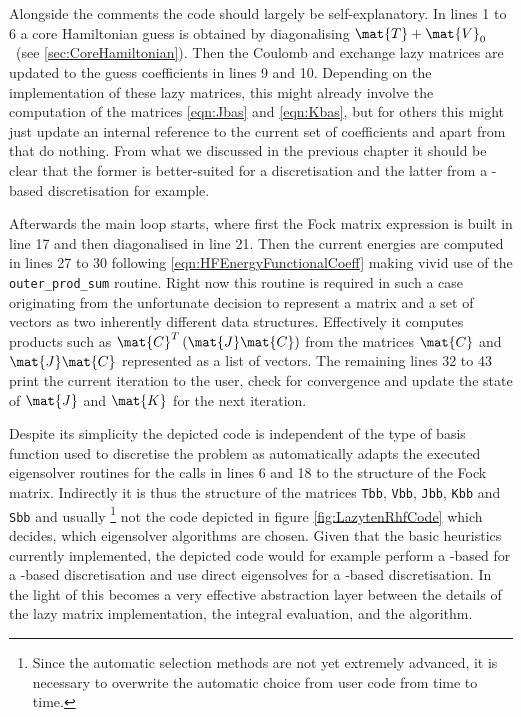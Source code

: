 Alongside the comments the code should largely be self-explanatory.
In lines 1 to 6 a core Hamiltonian guess is obtained by diagonalising
$\mat{T} + \mat{V}_0$~(see \ref{sec:CoreHamiltonian}).
Then the Coulomb and exchange lazy matrices
are updated to the guess coefficients in lines 9 and 10.
Depending on the implementation of these lazy matrices,
this might already involve the computation
of the matrices \eqref{eqn:Jbas} and \eqref{eqn:Kbas},
but for others this might just update an internal reference
to the current set of coefficients and apart from that do nothing.
From what we discussed in the previous chapter
it should be clear that the former is better-suited for a \cGTO
discretisation and the latter from a \FE-based discretisation for example.

Afterwards the main loop starts, where first the Fock matrix
expression is built in line 17 and then diagonalised in line 21.
Then the current energies are computed in lines 27 to 30
following \eqref{eqn:HFEnergyFunctionalCoeff} making
vivid use of the \texttt{outer\_prod\_sum} routine.
Right now this routine is required
in such a case originating from the unfortunate decision
to represent a matrix and a set of vectors as two inherently
different data structures.
Effectively it computes products such as
$\mat{C}^T \left(\mat{J} \mat{C}\right)$
from the matrices $\mat{C}$ and $\mat{J} \mat{C}$
represented as a list of vectors.
The remaining lines 32 to 43 print the current iteration
to the user, check for convergence and update the state
of $\mat{J}$ and $\mat{K}$ for the next iteration.

Despite its simplicity the depicted code is independent of
the type of basis function used to discretise the problem as
\lazyten automatically adapts the
executed eigensolver routines for the calls in lines 6 and 18
to the structure of the Fock matrix.
Indirectly it is thus the structure of the matrices
\texttt{Tbb}, \texttt{Vbb}, \texttt{Jbb}, \texttt{Kbb} and \texttt{Sbb}
and usually%
\footnote{Since the automatic selection methods are not yet extremely advanced,
it is necessary
to overwrite the automatic choice from user code from time to time.}
not the code depicted in figure \vref{fig:LazytenRhfCode}
which decides, which eigensolver algorithms are chosen.
Given that the basic heuristics currently implemented,
the depicted code would for example perform a \contraction-based \SCF
for a \CS-based discretisation and use direct eigensolves for a \cGTO-based
discretisation.
In the light of this \lazyten becomes a very effective
abstraction layer between the details of the lazy matrix implementation,
\ie the integral evaluation,
and the \SCF algorithm.

